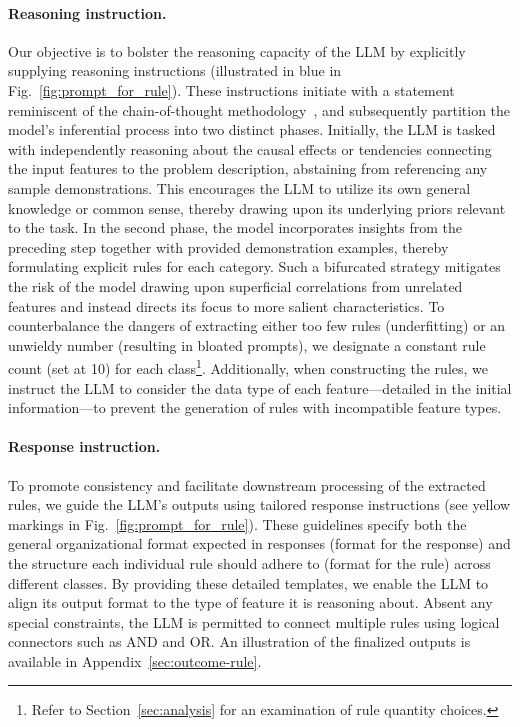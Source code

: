 \paragraph{Reasoning instruction.} Our objective is to bolster the reasoning capacity of the LLM by explicitly supplying reasoning instructions (illustrated in blue in Fig.~\ref{fig:prompt_for_rule}). These instructions initiate with a statement reminiscent of the chain-of-thought methodology~\cite{wei2022chain}, and subsequently partition the model's inferential process into two distinct phases. Initially, the LLM is tasked with independently reasoning about the causal effects or tendencies connecting the input features to the problem description, abstaining from referencing any sample demonstrations. This encourages the LLM to utilize its own general knowledge or common sense, thereby drawing upon its underlying priors relevant to the task. In the second phase, the model incorporates insights from the preceding step together with provided demonstration examples, thereby formulating explicit rules for each category. Such a bifurcated strategy mitigates the risk of the model drawing upon superficial correlations from unrelated features and instead directs its focus to more salient characteristics. To counterbalance the dangers of extracting either too few rules (underfitting) or an unwieldy number (resulting in bloated prompts), we designate a constant rule count (set at 10) for each class\footnote{Refer to Section~\ref{sec:analysis} for an examination of rule quantity choices.}. Additionally, when constructing the rules, we instruct the LLM to consider the data type of each feature—detailed in the initial information—to prevent the generation of rules with incompatible feature types.

\vspace*{-0.12in}
\paragraph{Response instruction.} To promote consistency and facilitate downstream processing of the extracted rules, we guide the LLM's outputs using tailored response instructions (see yellow markings in Fig.~\ref{fig:prompt_for_rule}). These guidelines specify both the general organizational format expected in responses (format for the response) and the structure each individual rule should adhere to (format for the rule) across different classes. By providing these detailed templates, we enable the LLM to align its output format to the type of feature it is reasoning about. Absent any special constraints, the LLM is permitted to connect multiple rules using logical connectors such as AND and OR. An illustration of the finalized outputs is available in Appendix~\ref{sec:outcome-rule}.

